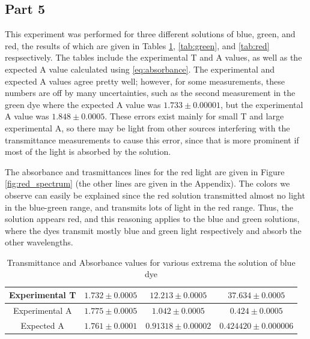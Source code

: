 \subsection{Part 5}
This experiment was performed for three different solutions of blue, green, and red, the results of which are given in Tables \ref{tab:blue}, \ref{tab:green}, and \ref{tab:red} respsectively. The tables include the experimental T and A values, as well as the expected A value calculated using \ref{eq:absorbance}. The experimental and expected A values agree pretty well; however, for some measurements, these numbers are off by many uncertainties, such as the second measurement in the green dye where the expected A value was $1.733\pm0.00001$, but the experimental A value was $1.848 \pm 0.0005$. These errors exist mainly for small T and large experimental A, so there may be light from other sources interfering with the transmittance measurements to cause this error, since that is more prominent if most of the light is absorbed by the solution.

The absorbance and trasmittances lines for the red light are given in Figure \ref{fig:red_spectrum} (the other lines are given in the Appendix). The colors we observe can easily be explained since the red solution transmitted almost no light in the blue-green range, and transmits lots of light in the red range. Thus, the solution appears red, and this reasoning applies to the blue and green solutions, where the dyes transmit mostly blue and green light respectively and absorb the other wavelengths.


\begin{table}
    \begin{adjustbox}{width=1.1\textwidth, center}
        \begin{tabular}{|c|c|c|c|}
            \hline Experimental T & $1.732 \pm 0.0005$ & $12.213 \pm 0.0005$   & $37.634 \pm 0.0005$     \\
            \hline Experimental A & $1.775 \pm 0.0005$ & $1.042 \pm 0.0005$    & $0.424 \pm 0.0005$      \\
            \hline Expected A     & $1.761 \pm 0.0001$ & $0.91318 \pm 0.00002$ & $0.424420 \pm 0.000006$ \\
            \hline
        \end{tabular}
    \end{adjustbox}
    \caption{Transmittance and Absorbance values for various extrema the solution of blue dye}
    \label{tab:blue}
\end{table}

